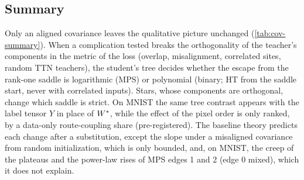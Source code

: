 \subsection{Summary}\label{sec:cov-summary}

Only an aligned covariance leaves the qualitative picture unchanged (\cref{tab:cov-summary}). When a
complication tested breaks the orthogonality of the teacher's components in the metric of the loss
(overlap, misalignment, correlated sites, random TTN teachers), the student's tree decides whether the
escape from the rank-one saddle is logarithmic (MPS) or polynomial (binary; HT from the saddle start,
never with correlated inputs). Stars, whose components are orthogonal, change which saddle is strict. On
MNIST the same tree contrast appears with the label tensor $Y$ in place of $W^{*}$, while the effect
of the pixel order is only ranked, by a data-only route-coupling share (pre-registered). The baseline
theory predicts each change after a substitution, except the slope under a misaligned covariance from
random initialization, which is only bounded, and, on MNIST, the creep of the plateaus and the power-law
rises of MPS edges 1 and 2 (edge 0 mixed), which it does not explain.


